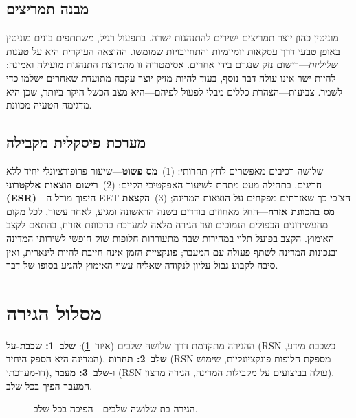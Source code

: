 \documentclass[11pt,a4paper,twocolumn]{article}
\begin{document}
\subsection{מבנה תמריצים}

מוניטין כהון יוצר תמריצים ישירים להתנהגות ישרה. בתפעול רגיל, משתתפים בונים מוניטין באופן טבעי דרך עסקאות יומיומיות והתחייבויות שמומשו. ההוצאה העיקרית היא על טענות \emph{שליליות}---רישום נזק שנגרם בידי אחרים. אסימטריה זו מתמרצת התנהגות מועילה ואמינה: להיות ישר אינו עולה דבר נוסף, בעוד להיות מזיק יוצר עקבה מתועדת שאחרים ישלמו כדי לשמר. צביעות---הצהרת כללים מבלי לפעול לפיהם---היא מצב הכשל היקר ביותר, שכן היא מדגימה הטעיה מכוונת.

\subsection{מערכת פיסקלית מקבילה}

שלושה רכיבים מאפשרים לחץ תחרותי: (1)~\textbf{מס פשוט}---שיעור פרופורציונלי יחיד ללא חריגים, בתחילה מעט מתחת לשיעור האפקטיבי הקיים; (2)~\textbf{רישום הוצאות אלקטרוני (ESR)}---היפוך מודל ה-EET הצ'כי כך שאזרחים מפקחים על הוצאות המדינה; (3)~\textbf{הקצאת מס בהכוונת אזרח}---החל מאחוזים בודדים בשנה הראשונה ומגיע, לאחר עשור, לכל מקום מהעשירונים הכפולים הנמוכים ועד הגירה מלאה למערכת בהכוונת אזרח, בהתאם לקצב האימוץ. הקצב בפועל תלוי במהירות שבה מתעוררות חלופות שוק חופשי לשירותי המדינה ובנכונות המדינה לשתף פעולה עם המעבר; פונקציית הזמן אינה חייבת להיות לינארית, ואין סיבה לקבוע גבול עליון לנקודה שאליה עשוי האימוץ להגיע בסופו של דבר.

\section{מסלול הגירה}

ההגירה מתקדמת דרך שלושה שלבים (איור~\ref{fig:migration}): \textbf{שלב~1: שכבת-על} (RSN כשכבת מידע, המדינה היא הספק היחיד), \textbf{שלב~2: תחרות} (RSN מספקת חלופות פונקציונליות, שימוש דו-מערכתי), ו-\textbf{שלב~3: מעבר} (RSN עולה בביצועים על מקבילות המדינה, הגירה מרצון). המעבר הפיך בכל שלב.

\begin{figure}[ht]
\centering
{}
\caption{הגירה בת-שלושה-שלבים---הפיכה בכל שלב.}
\label{fig:migration}
\end{figure}
\end{document}
